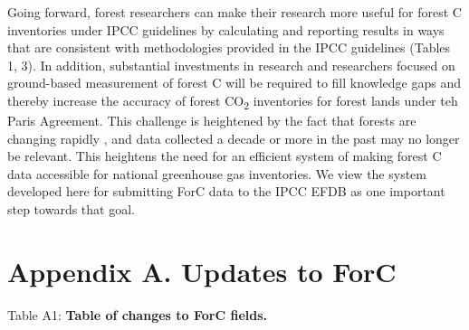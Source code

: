 \documentclass[, manuscript]{copernicus}
\begin{document}
Going forward, forest researchers can make their research more useful
for forest C inventories under IPCC guidelines by calculating and
reporting results in ways that are consistent with methodologies
provided in the IPCC guidelines (Tables 1, 3). In addition, substantial
investments in research and researchers focused on ground-based
measurement of forest C will be required to fill knowledge gaps and
thereby increase the accuracy of forest CO\textsubscript{2} inventories
for forest lands under teh Paris Agreement. This challenge is heightened
by the fact that forests are changing rapidly
\citep[e.g.,][]{mcdowell_pervasive_2020}, and data collected a decade or
more in the past may no longer be relevant. This heightens the need for
an efficient system of making forest C data accessible for national
greenhouse gas inventories. We view the system developed here for
submitting ForC data to the IPCC EFDB as one important step towards that
goal.

\clearpage

\section*{Appendix A. Updates to ForC}

\captionsetup[table]{labelformat=empty}

Table A1: \textbf{Table of changes to ForC fields.}
\begingroup\fontsize{8}{10}\selectfont
\end{document}
